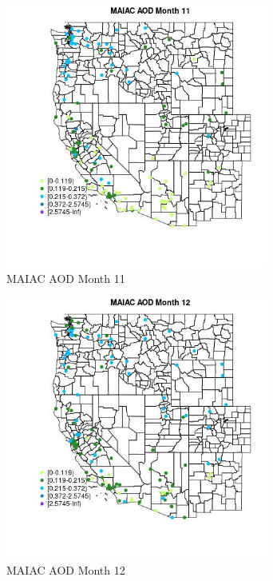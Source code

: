 \begin{figure} 
\centering  
\includegraphics[width=0.77\textwidth]{Code_Outputs/Report_ML_input_PM25_Step4_part_e_de_duplicated_aves_MapObsMo11MAIAC_AOD.jpg} 
\caption{\label{fig:Report_ML_input_PM25_Step4_part_e_de_duplicated_avesMapObsMo11MAIAC_AOD}MAIAC AOD Month 11} 
\end{figure} 
 

\begin{figure} 
\centering  
\includegraphics[width=0.77\textwidth]{Code_Outputs/Report_ML_input_PM25_Step4_part_e_de_duplicated_aves_MapObsMo12MAIAC_AOD.jpg} 
\caption{\label{fig:Report_ML_input_PM25_Step4_part_e_de_duplicated_avesMapObsMo12MAIAC_AOD}MAIAC AOD Month 12} 
\end{figure} 
 

